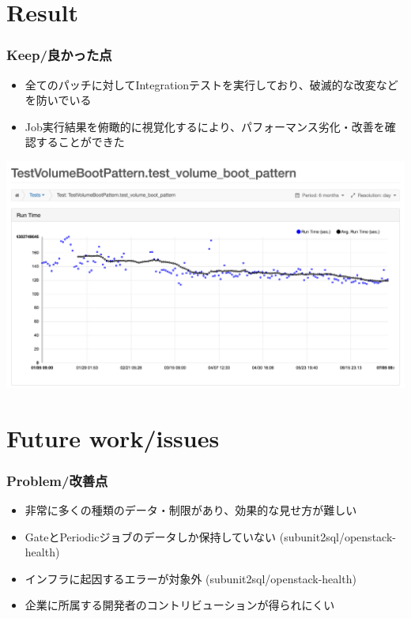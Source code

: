 \documentclass[aspectratio=169,11pt,hyperref={colorlinks=true}]{beamer}
\begin{document}
\section{Result}
\begin{frame}
  \frametitle{Keep/良かった点}
  \begin{itemize}
    \item 全てのパッチに対してIntegrationテストを実行しており、破滅的な改変などを防いでいる
    \item Job実行結果を俯瞰的に視覚化するにより、パフォーマンス劣化・改善を確認することができた
  \end{itemize}
  \begin{center}
    \includegraphics[width=1.1\textheight]{openstack-health-test_volume_boot_pattern.png}
  \end{center}
\end{frame}

\section{Future work/issues}
\begin{frame}
  \frametitle{Problem/改善点}
  \begin{itemize}
    \item 非常に多くの種類のデータ・制限があり、効果的な見せ方が難しい
    \item GateとPeriodicジョブのデータしか保持していない (subunit2sql/openstack-health)
    \item インフラに起因するエラーが対象外 (subunit2sql/openstack-health)
    \item 企業に所属する開発者のコントリビューションが得られにくい
  \end{itemize}
\end{frame}
\end{document}
